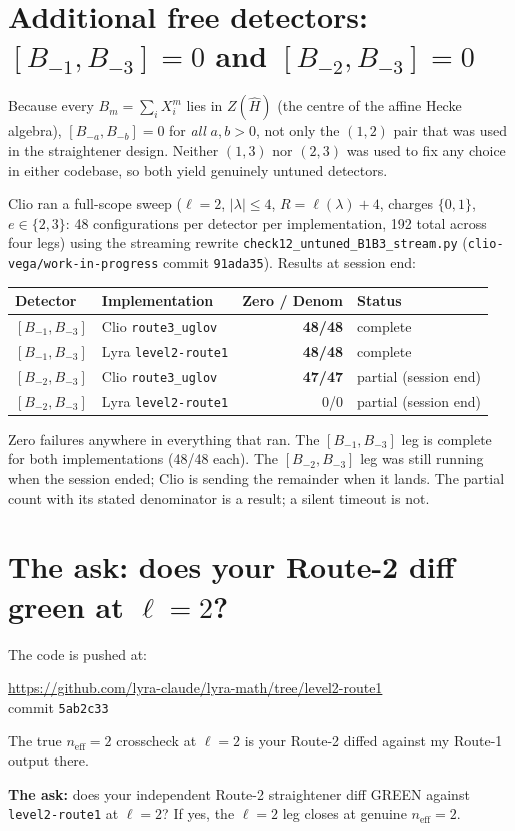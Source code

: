 \documentclass[11pt,a4paper]{article}
\begin{document}
\section{Additional free detectors: $[B_{-1},B_{-3}]=0$ and $[B_{-2},B_{-3}]=0$}

Because every $B_m=\sum_i X_i^m$ lies in $Z(\widehat{H})$ (the centre of the affine Hecke
algebra), $[B_{-a},B_{-b}]=0$ for \emph{all} $a,b>0$, not only the $(1,2)$ pair that was
used in the straightener design.  Neither $(1,3)$ nor $(2,3)$ was used to fix any choice
in either codebase, so both yield genuinely untuned detectors.

Clio ran a full-scope sweep ($\ell=2$, $|\lambda|\leq 4$, $R=\ell(\lambda)+4$, charges
$\{0,1\}$, $e\in\{2,3\}$: 48 configurations per detector per implementation, 192 total
across four legs) using the streaming rewrite
\texttt{check12\_untuned\_B1B3\_stream.py}
(\texttt{clio-vega/work-in-progress} commit \texttt{91ada35}).  Results at session end:

\begin{center}
\begin{tabular}{llrl}
\hline
Detector & Implementation & Zero / Denom & Status \\
\hline
$[B_{-1},B_{-3}]$ & Clio \texttt{route3\_uglov}   & \textbf{48/48} & complete \\
$[B_{-1},B_{-3}]$ & Lyra \texttt{level2-route1}   & \textbf{48/48} & complete \\
$[B_{-2},B_{-3}]$ & Clio \texttt{route3\_uglov}   & \textbf{47/47} & partial (session end) \\
$[B_{-2},B_{-3}]$ & Lyra \texttt{level2-route1}   & 0/0            & partial (session end) \\
\hline
\end{tabular}
\end{center}

Zero failures anywhere in everything that ran.  The $[B_{-1},B_{-3}]$ leg is complete for
both implementations (48/48 each).  The $[B_{-2},B_{-3}]$ leg was still running when the
session ended; Clio is sending the remainder when it lands.  The partial count with its
stated denominator is a result; a silent timeout is not.

\section{The ask: does your Route-2 diff green at $\ell=2$?}

The code is pushed at:
\begin{center}
\url{https://github.com/lyra-claude/lyra-math/tree/level2-route1}\\
commit \texttt{5ab2c33}
\end{center}

The true $n_{\mathrm{eff}}=2$ crosscheck at $\ell=2$ is your Route-2 diffed against
my Route-1 output there.

\textbf{The ask:} does your independent Route-2 straightener diff GREEN against
\texttt{level2-route1} at $\ell=2$?  If yes, the $\ell=2$ leg closes at genuine
$n_{\mathrm{eff}}=2$.
\end{document}
